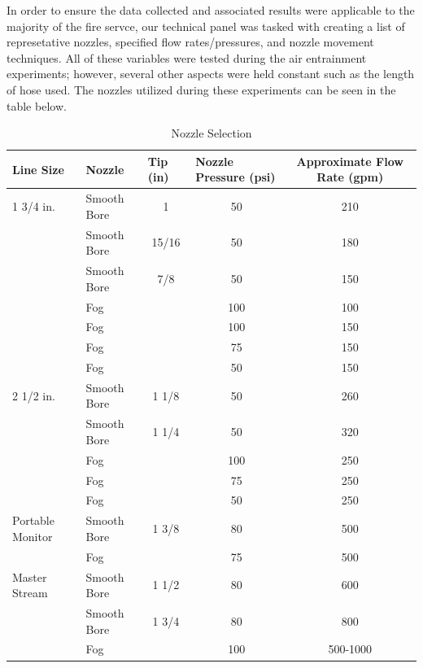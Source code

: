\documentclass{article}
\begin{document}
In order to ensure the data collected and associated results were applicable to the majority of the fire servce, our technical panel was tasked with creating a list of represetative nozzles, specified flow rates/pressures, and nozzle movement techniques. All of these variables were tested during the air entrainment experiments; however, several other aspects were held constant such as the length of hose used. The nozzles utilized during these experiments can be seen in the table below.

\vspace*{\baselineskip}

\begin{table}[!ht]
\centering
\begin{tabular}{|llccc|}
\hline
\multicolumn{1}{|l|}{\textbf{Line Size}} & \multicolumn{1}{l|}{\textbf{Nozzle}} & \multicolumn{1}{l|}{\textbf{Tip (in)}} & \multicolumn{1}{l|}{\textbf{Nozzle Pressure (psi)}} & \textbf{Approximate Flow Rate (gpm)} \\ \hline
1 3/4 in. & Smooth Bore & 1 & 50 & 210 \\
 & Smooth Bore & 15/16 & 50 & 180 \\
 & Smooth Bore & 7/8 & 50 & 150 \\
 & Fog &  & 100 & 100 \\
 & Fog &  & 100 & 150 \\
 & Fog &  & 75 & 150 \\
 & Fog &  & 50 & 150 \\ \hline
2 1/2 in. & Smooth Bore & 1 1/8 & 50 & 260 \\
 & Smooth Bore & 1 1/4 & 50 & 320 \\
 & Fog &  & 100 & 250 \\
 & Fog &  & 75 & 250 \\
 & Fog &  & 50 & 250 \\ \hline
Portable Monitor & Smooth Bore & 1 3/8 & 80 & 500 \\
 & Fog &  & 75 & 500 \\ \hline
Master Stream & Smooth Bore & 1 1/2 & 80 & 600 \\
 & Smooth Bore & 1 3/4 & 80 & 800 \\
 & Fog &  & 100 & 500-1000 \\ \hline
\end{tabular}
\caption{Nozzle Selection}
\label{Nozzle Selection}
\end{table}

\vspace*{\baselineskip}
\end{document}

